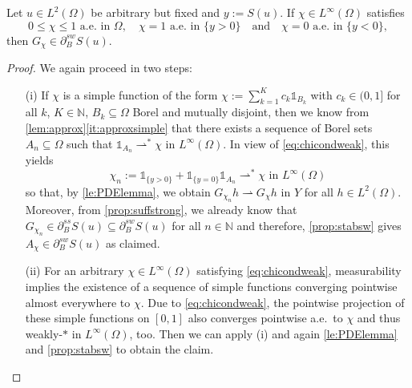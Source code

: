 \documentclass[reqno]{shinyart}
\begin{document}
\begin{proposition}\label{prop:suffweak}
    Let $u \in L^2(\Omega)$ be arbitrary but fixed and $y := S(u)$.
    If $\chi \in L^\infty(\Omega)$ satisfies
    \begin{equation}\label{eq:chicondweak}
        0 \leq \chi \leq 1 \text{ a.e.\ in }\Omega, \quad \chi = 1 \text{ a.e.\ in } \{y > 0\}
        \quad \text{and} \quad \chi = 0 \text{ a.e.\ in } \{y < 0\}, 
    \end{equation}
    then $G_\chi \in \partial_B^{sw} S(u)$.
\end{proposition}

\begin{proof}
    We again proceed in two steps:
    \begin{itemize}
        \item[(i)] If $\chi$ is a simple function of the form
            $
            \chi := \sum_{k=1}^K c_k \mathbb{1}_{B_k}
            $
            with $c_k \in (0, 1]$ for all $k$, $K \in \mathbb{N}$, $B_k \subseteq \Omega$ Borel 
            and mutually disjoint, then we know from \cref{lem:approx}\ref{it:approxsimple} 
            that there exists a sequence of Borel sets $A_n \subseteq \Omega$ such that
            $\mathbb{1}_{A_n} {\rightharpoonup}^{*} \chi$ in $L^\infty(\Omega)$.
            In view of \eqref{eq:chicondweak}, this yields
            \begin{equation*}
                \chi_n := \mathbb{1}_{\{y>0\}} + \mathbb{1}_{\{y=0\} } \mathbb{1}_{A_n} 
                {\rightharpoonup}^{*}  \chi   \text{ in }L^\infty(\Omega)
            \end{equation*}    
            so that, by \cref{le:PDElemma}, we obtain $G_{\chi_n} h \rightharpoonup  G_{\chi} h$
            in $Y$ for all $h \in L^2(\Omega)$. Moreover, 
            from \cref{prop:suffstrong}, we already know that
            $G_{\chi_n} \in \partial_B^{ss} S(u) \subseteq \partial_B^{sw} S(u)$ for all $n\in{\mathbb{N}}$ and
            therefore, \cref{prop:stabsw} gives $A_{\chi} \in \partial_B^{sw} S(u)$ as claimed. 
        \item[(ii)] For an arbitrary $\chi \in L^\infty(\Omega)$ satisfying \eqref{eq:chicondweak}, 
            measurability implies the existence of a sequence of simple functions converging 
            pointwise almost everywhere to $\chi$. Due to \eqref{eq:chicondweak}, the pointwise projection 
            of these simple functions on $[0,1]$ also converges pointwise a.e.\ to $\chi$ and thus 
            weakly-$\ast$ in $L^\infty(\Omega)$, too. Then we can apply (i) and again 
            \cref{le:PDElemma} and \cref{prop:stabsw} to obtain the claim. 
            \qedhere
    \end{itemize}
\end{proof}
\end{document}
